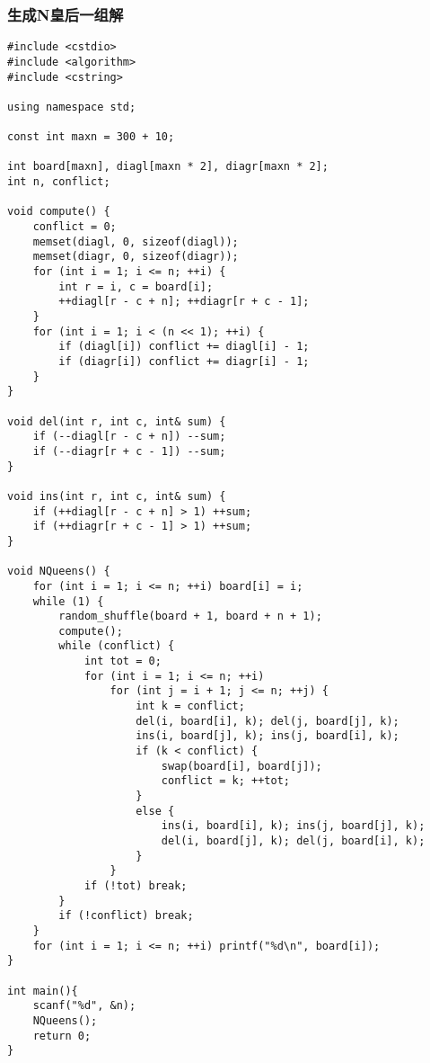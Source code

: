 \subsubsection{生成N皇后一组解}
\begin{verbatim}
#include <cstdio>
#include <algorithm>
#include <cstring>

using namespace std;

const int maxn = 300 + 10;

int board[maxn], diagl[maxn * 2], diagr[maxn * 2];
int n, conflict;

void compute() {
    conflict = 0;
    memset(diagl, 0, sizeof(diagl));
    memset(diagr, 0, sizeof(diagr));
    for (int i = 1; i <= n; ++i) {
        int r = i, c = board[i];
        ++diagl[r - c + n]; ++diagr[r + c - 1];
    }
    for (int i = 1; i < (n << 1); ++i) {
        if (diagl[i]) conflict += diagl[i] - 1;
        if (diagr[i]) conflict += diagr[i] - 1;
    }
}

void del(int r, int c, int& sum) {
    if (--diagl[r - c + n]) --sum;
    if (--diagr[r + c - 1]) --sum;
}

void ins(int r, int c, int& sum) {
    if (++diagl[r - c + n] > 1) ++sum;
    if (++diagr[r + c - 1] > 1) ++sum;
}

void NQueens() {
    for (int i = 1; i <= n; ++i) board[i] = i;
    while (1) {
        random_shuffle(board + 1, board + n + 1);
        compute();
        while (conflict) {
            int tot = 0;
            for (int i = 1; i <= n; ++i)
                for (int j = i + 1; j <= n; ++j) {
                    int k = conflict;
                    del(i, board[i], k); del(j, board[j], k);
                    ins(i, board[j], k); ins(j, board[i], k);
                    if (k < conflict) {
                        swap(board[i], board[j]);
                        conflict = k; ++tot;
                    }
                    else {
                        ins(i, board[i], k); ins(j, board[j], k);
                        del(i, board[j], k); del(j, board[i], k);
                    }
                }
            if (!tot) break;
        }
        if (!conflict) break;
    }
    for (int i = 1; i <= n; ++i) printf("%d\n", board[i]);
}

int main(){
    scanf("%d", &n);
    NQueens();
    return 0;
}
\end{verbatim}
